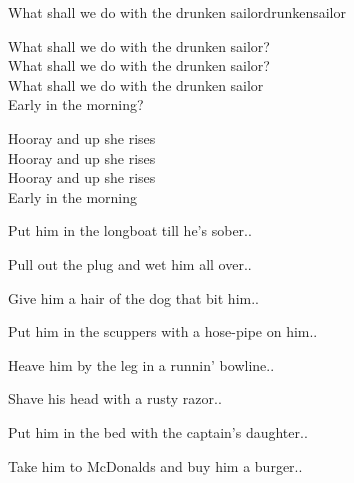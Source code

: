 \begin{song}{What shall we do with the drunken sailor}{drunkensailor}
\begin{vers}
What shall we do with the drunken sailor?\\
What shall we do with the drunken sailor?\\
What shall we do with the drunken sailor\\
Early in the morning?\\
\end{vers}
\begin{vers}
Hooray and up she rises\\
Hooray and up she rises\\
Hooray and up she rises\\
Early in the morning\\
\end{vers}
\begin{vers}
Put him in the longboat till he's sober..\\
\end{vers}
\begin{vers}
Pull out the plug and wet him all over..\\
\end{vers}
\begin{vers}
Give him a hair of the dog that bit him..\\
\end{vers}
\begin{vers}
Put him in the scuppers with a hose-pipe on him..\\
\end{vers}
\begin{vers}
Heave him by the leg in a runnin' bowline..\\
\end{vers}
\begin{vers}
Shave his head with a rusty razor..\\
\end{vers}
\begin{vers}
Put him in the bed with the captain's daughter..\\
\end{vers}
\begin{vers}
Take him to McDonalds and buy him a burger..\\
\end{vers}
\end{song}

